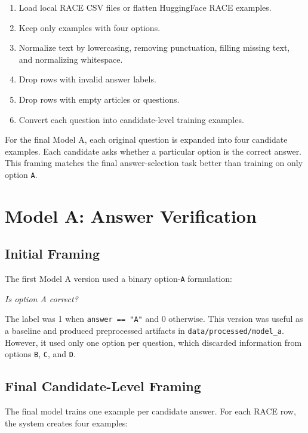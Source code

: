 \documentclass[12pt,a4paper]{article}
\begin{document}
\begin{enumerate}
    \item Load local RACE CSV files or flatten HuggingFace RACE examples.
    \item Keep only examples with four options.
    \item Normalize text by lowercasing, removing punctuation, filling missing
    text, and normalizing whitespace.
    \item Drop rows with invalid answer labels.
    \item Drop rows with empty articles or questions.
    \item Convert each question into candidate-level training examples.
\end{enumerate}

For the final Model A, each original question is expanded into four candidate
examples. Each candidate asks whether a particular option is the correct answer.
This framing matches the final answer-selection task better than training on
only option \texttt{A}.

\section{Model A: Answer Verification}

\subsection{Initial Framing}

The first Model A version used a binary option-\texttt{A} formulation:

\begin{center}
\textit{Is option A correct?}
\end{center}

The label was 1 when \texttt{answer == "A"} and 0 otherwise. This version was
useful as a baseline and produced preprocessed artifacts in
\texttt{data/processed/model\_a}. However, it used only one option per question,
which discarded information from options \texttt{B}, \texttt{C}, and \texttt{D}.

\subsection{Final Candidate-Level Framing}

The final model trains one example per candidate answer. For each RACE row, the
system creates four examples:
\end{document}
